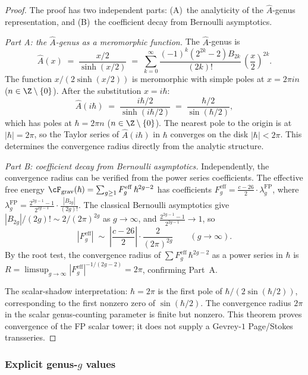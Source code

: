 \begin{proof}
The proof has two independent parts: (A)~the analyticity
of the $\hat A$-genus representation, and (B)~the coefficient
decay from Bernoulli asymptotics.

\emph{Part A: the $\hat A$-genus as a meromorphic function.}
The $\hat A$-genus is
\[
\hat A(x)
\;=\;
\frac{x/2}{\sinh(x/2)}
\;=\;
\sum_{k=0}^{\infty}
\frac{(-1)^k(2^{2k}-2)B_{2k}}{(2k)!}\,
\left(\frac{x}{2}\right)^{2k}.
\]
The function $x/(2\sinh(x/2))$ is meromorphic with simple
poles at $x = 2\pi i n$ ($n \in \Z \setminus \{0\}$).
After the substitution $x = i\hbar$:
\[
\hat A(i\hbar)
\;=\;
\frac{i\hbar/2}{\sinh(i\hbar/2)}
\;=\;
\frac{\hbar/2}{\sin(\hbar/2)},
\]
which has poles at $\hbar = 2\pi n$ ($n \in \Z \setminus \{0\}$).
The nearest pole to the origin is at $|\hbar| = 2\pi$, so the
Taylor series of $\hat A(i\hbar)$ in $\hbar$ converges on the
disk $|\hbar| < 2\pi$. This determines the convergence radius
directly from the analytic structure.

\emph{Part B: coefficient decay from Bernoulli asymptotics.}
Independently, the convergence radius can be verified from the
power series coefficients. The effective free energy
$\cF_{\mathrm{grav}}(\hbar) = \sum_{g \ge 1} F_g^{\mathrm{eff}}\, \hbar^{2g-2}$
has coefficients $F_g^{\mathrm{eff}} = \frac{c-26}{2}\cdot
\lambda_g^{\mathrm{FP}}$, where
$\lambda_g^{\mathrm{FP}}
= \frac{2^{2g-1}-1}{2^{2g-1}} \cdot \frac{|B_{2g}|}{(2g)!}$.
The classical Bernoulli asymptotics give
$|B_{2g}|/(2g)! \sim 2/(2\pi)^{2g}$ as $g \to \infty$,
and $\frac{2^{2g-1}-1}{2^{2g-1}} \to 1$, so
\[
|F_g^{\mathrm{eff}}|
\;\sim\;
\left|\frac{c-26}{2}\right|
\cdot \frac{2}{(2\pi)^{2g}}
\qquad (g \to \infty).
\]
By the root test, the convergence radius of $\sum F_g^{\mathrm{eff}}\,\hbar^{2g-2}$
as a power series in $\hbar$ is
$R = \limsup_{g \to \infty} |F_g^{\mathrm{eff}}|^{-1/(2g-2)} = 2\pi$,
confirming Part~A.

The scalar-shadow interpretation: $\hbar = 2\pi$ is the
first pole of $\hbar/(2\sin(\hbar/2))$, corresponding to the
first nonzero zero of $\sin(\hbar/2)$. The convergence radius
$2\pi$ in the scalar genus-counting parameter is finite
but nonzero. This theorem proves convergence of the FP scalar tower;
it does not supply a Gevrey-$1$ Page/Stokes transseries.
\end{proof}

\subsubsection*{Explicit genus-$g$ values}


